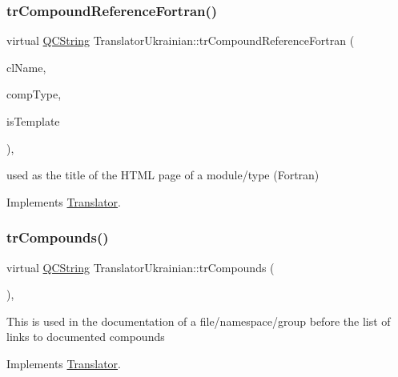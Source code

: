 \subsubsection{\texorpdfstring{trCompoundReferenceFortran()}{trCompoundReferenceFortran()}}
{\footnotesize\ttfamily virtual \mbox{\hyperlink{class_q_c_string}{Q\+C\+String}} Translator\+Ukrainian\+::tr\+Compound\+Reference\+Fortran (\begin{DoxyParamCaption}\item[{const char $\ast$}]{cl\+Name,  }\item[{\mbox{\hyperlink{class_class_def_ae70cf86d35fe954a94c566fbcfc87939}{Class\+Def\+::\+Compound\+Type}}}]{comp\+Type,  }\item[{bool}]{is\+Template }\end{DoxyParamCaption})\hspace{0.3cm}{\ttfamily [inline]}, {\ttfamily [virtual]}}

used as the title of the H\+T\+ML page of a module/type (Fortran) 

Implements \mbox{\hyperlink{class_translator}{Translator}}.

\mbox{\label{class_translator_ukrainian_a1ec7b1a417c74dc8a919a42631dc02a4}} 
\subsubsection{\texorpdfstring{trCompounds()}{trCompounds()}}
{\footnotesize\ttfamily virtual \mbox{\hyperlink{class_q_c_string}{Q\+C\+String}} Translator\+Ukrainian\+::tr\+Compounds (\begin{DoxyParamCaption}{ }\end{DoxyParamCaption})\hspace{0.3cm}{\ttfamily [inline]}, {\ttfamily [virtual]}}

This is used in the documentation of a file/namespace/group before the list of links to documented compounds 

Implements \mbox{\hyperlink{class_translator}{Translator}}.

\mbox{\label{class_translator_ukrainian_a90be9a6f14ceb96a6d18c6230aeab9ab}} 
